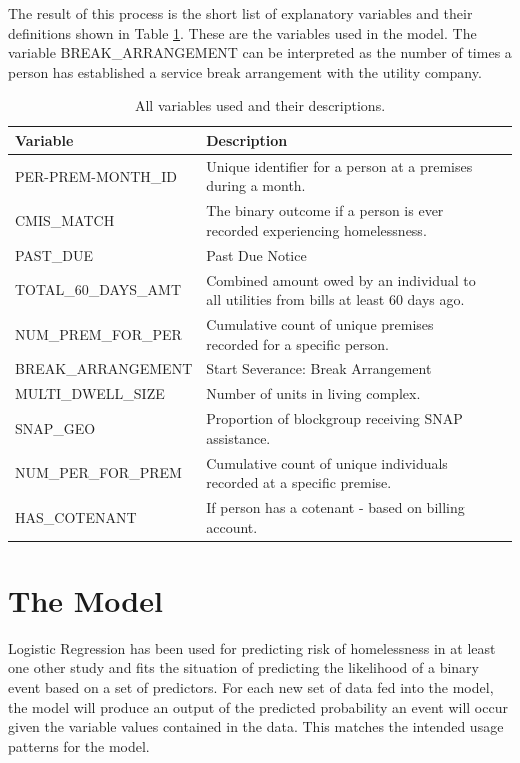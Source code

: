 \documentclass[12pt]{report}
\begin{document}
The result of this process is the short list of explanatory variables and their definitions shown in Table \ref{tbl:varsUsed}. These are the variables used in the model. The variable BREAK\_ARRANGEMENT can be interpreted as the number of times a person has established a service break arrangement with the utility company.

\begin{table}[h]
    \centering
    \begin{tabular}{l p{10cm} l p{16cm}}
        \toprule
        Variable &                  Description \\
        \midrule
        PER-PREM-MONTH\_ID & Unique identifier for a person at a premises during a month. \\
        CMIS\_MATCH & The binary outcome if a person is ever recorded experiencing homelessness. \\
        PAST\_DUE & Past Due Notice \\
        TOTAL\_60\_DAYS\_AMT & Combined amount owed by an individual to all utilities from bills at least 60 days ago. \\
        NUM\_PREM\_FOR\_PER & Cumulative count of unique premises recorded for a specific person. \\
        BREAK\_ARRANGEMENT & Start Severance: Break Arrangement \\
        MULTI\_DWELL\_SIZE & Number of units in living complex. \\
        SNAP\_GEO & Proportion of blockgroup receiving SNAP assistance. \\
        NUM\_PER\_FOR\_PREM & Cumulative count of unique individuals recorded at a specific premise. \\
        HAS\_COTENANT & If person has a cotenant - based on billing account. \\
        \midrule
    \end{tabular}
    \caption[Variables Used]{All variables used and their descriptions.}
    \label{tbl:varsUsed}
\end{table}

\section{The Model}
Logistic Regression has been used for predicting risk of homelessness in at least one other study \cite{van2009longitudinal} and fits the situation of predicting the likelihood of a binary event based on a set of predictors. For each new set of data fed into the model, the model will produce an output of the predicted probability an event will occur given the variable values contained in the data. This matches the intended usage patterns for the model. 
\end{document}
